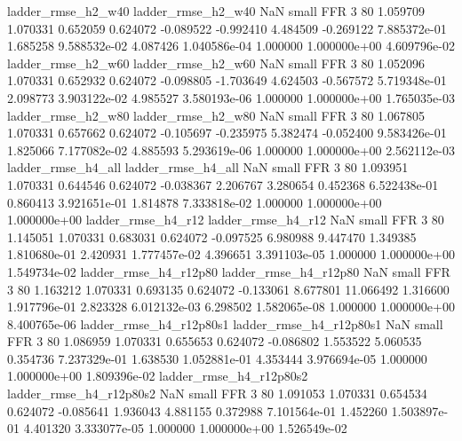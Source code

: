       ladder_rmse_h2_w40       ladder_rmse_h2_w40                   NaN      small      FFR                 3 80 1.059709       1.070331 0.652059       0.624072   -0.089522     -0.992410      4.484509    -0.269122   7.885372e-01  1.685258 9.588532e-02     4.087426   1.040586e-04            1.000000    1.000000e+00        4.609796e-02
      ladder_rmse_h2_w60       ladder_rmse_h2_w60                   NaN      small      FFR                 3 80 1.052096       1.070331 0.652932       0.624072   -0.098805     -1.703649      4.624503    -0.567572   5.719348e-01  2.098773 3.903122e-02     4.985527   3.580193e-06            1.000000    1.000000e+00        1.765035e-03
      ladder_rmse_h2_w80       ladder_rmse_h2_w80                   NaN      small      FFR                 3 80 1.067805       1.070331 0.657662       0.624072   -0.105697     -0.235975      5.382474    -0.052400   9.583426e-01  1.825066 7.177082e-02     4.885593   5.293619e-06            1.000000    1.000000e+00        2.562112e-03
      ladder_rmse_h4_all       ladder_rmse_h4_all                   NaN      small      FFR                 3 80 1.093951       1.070331 0.644546       0.624072   -0.038367      2.206767      3.280654     0.452368   6.522438e-01  0.860413 3.921651e-01     1.814878   7.333818e-02            1.000000    1.000000e+00        1.000000e+00
      ladder_rmse_h4_r12       ladder_rmse_h4_r12                   NaN      small      FFR                 3 80 1.145051       1.070331 0.683031       0.624072   -0.097525      6.980988      9.447470     1.349385   1.810680e-01  2.420931 1.777457e-02     4.396651   3.391103e-05            1.000000    1.000000e+00        1.549734e-02
   ladder_rmse_h4_r12p80    ladder_rmse_h4_r12p80                   NaN      small      FFR                 3 80 1.163212       1.070331 0.693135       0.624072   -0.133061      8.677801     11.066492     1.316600   1.917796e-01  2.823328 6.012132e-03     6.298502   1.582065e-08            1.000000    1.000000e+00        8.400765e-06
 ladder_rmse_h4_r12p80s1  ladder_rmse_h4_r12p80s1                   NaN      small      FFR                 3 80 1.086959       1.070331 0.655653       0.624072   -0.086802      1.553522      5.060535     0.354736   7.237329e-01  1.638530 1.052881e-01     4.353444   3.976694e-05            1.000000    1.000000e+00        1.809396e-02
 ladder_rmse_h4_r12p80s2  ladder_rmse_h4_r12p80s2                   NaN      small      FFR                 3 80 1.091053       1.070331 0.654534       0.624072   -0.085641      1.936043      4.881155     0.372988   7.101564e-01  1.452260 1.503897e-01     4.401320   3.333077e-05            1.000000    1.000000e+00        1.526549e-02
